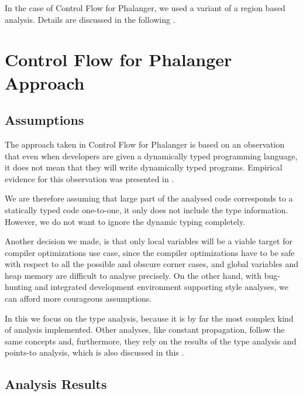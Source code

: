         In the case of Control Flow for Phalanger, we used 
        a variant of a region based analysis. Details are 
        discussed in the following \wsection{}.
    
    \section{Control Flow for Phalanger Approach}
        
        \subsection{Assumptions}        
        The approach taken in Control Flow for Phalanger is based on an 
        observation that even when developers are given a dynamically typed 
        programming language, it does not mean that they will write 
        dynamically typed programs. Empirical evidence for this 
        observation was presented in \cite{walker1996type}. 
        
        We are therefore assuming that large part of the analysed 
        code corresponds to a statically typed code one-to-one, 
        it only does not include the type information. However, 
        we do not want to ignore the dynamic typing completely.

        Another decision we made, is that only local variables 
        will be a viable target for compiler optimizations use 
        case, since the compiler optimizations have to be safe with 
        respect to all the possible and obscure corner cases, 
        and global variables and heap memory are difficult to 
        analyse precisely. On the other hand, with bug-hunting and 
        integrated development environment supporting style 
        analyses, we can afford more courageous assumptions.
        
        In this \wsection{} we focus on the type analysis, because 
        it is by far the most complex kind of analysis implemented. 
        Other analyses, like constant propagation, follow the same 
        concepts and, furthermore, they rely on the results of the 
        type analysis and points-to analysis, which is 
        also discussed in this \wsection{}.
        
        \subsection{Analysis Results}
        
